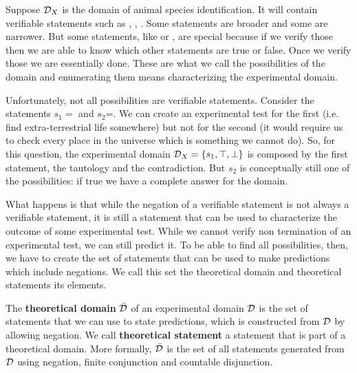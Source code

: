 \documentclass[11pt,letterpaper,fleqn]{memoir} %
\begin{document}
Suppose $\mathcal{D}_X$ is the domain of animal species identification. It will contain verifiable statements such as , , . Some statements are broader and some are narrower. But some statements, like  or , are special because if we verify those then we are able to know which other statements are true or false. Once we verify those we are essentially done. These are what we call the possibilities of the domain and enumerating them means characterizing the experimental domain.

Unfortunately, not all possibilities are verifiable statements. Consider the statements $s_1=$ and $s_2$=. We can create an experimental test for the first (i.e. find extra-terrestrial life somewhere) but not for the second (it would require us to check every place in the universe which is something we cannot do). So, for this question, the experimental domain $\mathcal{D}_X = \{s_1, \top, \bot\}$ is composed by the first statement, the tautology and the contradiction. But $s_2$ is conceptually still one of the possibilities: if true we have a complete answer for the domain.

What happens is that while the negation of a verifiable statement is not always a verifiable statement, it is still a statement that can be used to characterize the outcome of some experimental test. While we cannot verify non termination of an experimental test, we can still predict it. To be able to find all possibilities, then, we have to create the set of statements that can be used to make predictions which include negations. We call this set the theoretical domain and theoretical statements its elements.

\begin{mathSection}
\begin{defn}
	The \textbf{theoretical domain} $\bar{\mathcal{D}}$ of an experimental domain $\mathcal{D}$ is the set of statements that we can use to state predictions, which is constructed from $\mathcal{D}$ by allowing negation. We call \textbf{theoretical statement} a statement that is part of a theoretical domain. More formally, $\bar{\mathcal{D}}$ is the set of all statements generated from $\mathcal{D}$ using negation, finite conjunction and countable disjunction.
\end{defn}
\end{mathSection}
\end{document}
